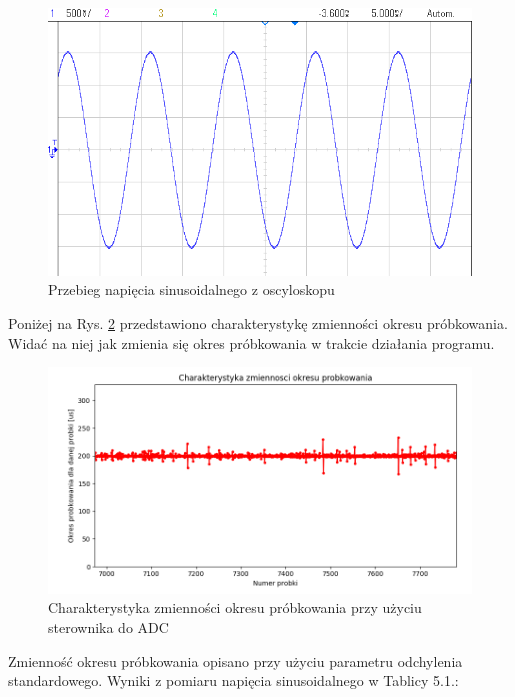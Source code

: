 \begin{figure}[H]
	\centering
		\includegraphics[width=12cm]{sin_max1202_100Hz_osc.png}
	\caption{Przebieg napięcia sinusoidalnego z oscyloskopu} 
	\label{fig:sin_max1202_100Hz_osc}
\end{figure}

Poniżej na Rys. \ref{fig:zmiennosc_probkowania_max1202} przedstawiono charakterystykę zmienności okresu próbkowania. Widać na niej jak zmienia się okres próbkowania w trakcie działania programu.

\begin{figure}[h]
	\centering
		\includegraphics[width=14cm]{zmiennosc_probkowania_max1202}
	\caption{Charakterystyka zmienności okresu próbkowania przy użyciu sterownika do ADC} 
	\label{fig:zmiennosc_probkowania_max1202}
\end{figure}

Zmienność okresu próbkowania opisano przy użyciu parametru odchylenia standardowego. Wyniki z pomiaru napięcia sinusoidalnego w Tablicy 5.1.:

